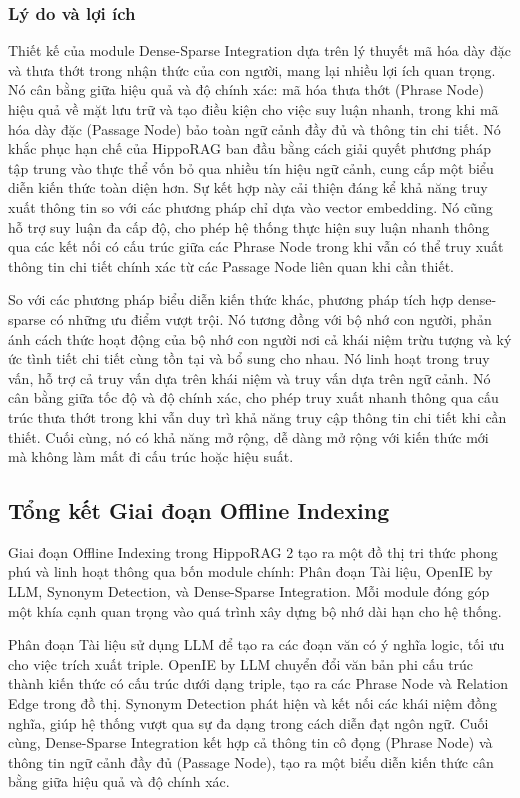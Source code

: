 \subsubsection{Lý do và lợi ích}
Thiết kế của module Dense-Sparse Integration dựa trên lý thuyết mã hóa dày đặc và thưa thớt trong nhận thức của con người, mang lại nhiều lợi ích quan trọng. Nó cân bằng giữa hiệu quả và độ chính xác: mã hóa thưa thớt (Phrase Node) hiệu quả về mặt lưu trữ và tạo điều kiện cho việc suy luận nhanh, trong khi mã hóa dày đặc (Passage Node) bảo toàn ngữ cảnh đầy đủ và thông tin chi tiết. Nó khắc phục hạn chế của HippoRAG ban đầu bằng cách giải quyết phương pháp tập trung vào thực thể vốn bỏ qua nhiều tín hiệu ngữ cảnh, cung cấp một biểu diễn kiến thức toàn diện hơn. Sự kết hợp này cải thiện đáng kể khả năng truy xuất thông tin so với các phương pháp chỉ dựa vào vector embedding. Nó cũng hỗ trợ suy luận đa cấp độ, cho phép hệ thống thực hiện suy luận nhanh thông qua các kết nối có cấu trúc giữa các Phrase Node trong khi vẫn có thể truy xuất thông tin chi tiết chính xác từ các Passage Node liên quan khi cần thiết.

So với các phương pháp biểu diễn kiến thức khác, phương pháp tích hợp dense-sparse có những ưu điểm vượt trội. Nó tương đồng với bộ nhớ con người, phản ánh cách thức hoạt động của bộ nhớ con người nơi cả khái niệm trừu tượng và ký ức tình tiết chi tiết cùng tồn tại và bổ sung cho nhau. Nó linh hoạt trong truy vấn, hỗ trợ cả truy vấn dựa trên khái niệm và truy vấn dựa trên ngữ cảnh. Nó cân bằng giữa tốc độ và độ chính xác, cho phép truy xuất nhanh thông qua cấu trúc thưa thớt trong khi vẫn duy trì khả năng truy cập thông tin chi tiết khi cần thiết. Cuối cùng, nó có khả năng mở rộng, dễ dàng mở rộng với kiến thức mới mà không làm mất đi cấu trúc hoặc hiệu suất.

\subsection{Tổng kết Giai đoạn Offline Indexing}

Giai đoạn Offline Indexing trong HippoRAG 2 tạo ra một đồ thị tri thức phong phú và linh hoạt thông qua bốn module chính: Phân đoạn Tài liệu, OpenIE by LLM, Synonym Detection, và Dense-Sparse Integration. Mỗi module đóng góp một khía cạnh quan trọng vào quá trình xây dựng bộ nhớ dài hạn cho hệ thống.

Phân đoạn Tài liệu sử dụng LLM để tạo ra các đoạn văn có ý nghĩa logic, tối ưu cho việc trích xuất triple. OpenIE by LLM chuyển đổi văn bản phi cấu trúc thành kiến thức có cấu trúc dưới dạng triple, tạo ra các Phrase Node và Relation Edge trong đồ thị. Synonym Detection phát hiện và kết nối các khái niệm đồng nghĩa, giúp hệ thống vượt qua sự đa dạng trong cách diễn đạt ngôn ngữ. Cuối cùng, Dense-Sparse Integration kết hợp cả thông tin cô đọng (Phrase Node) và thông tin ngữ cảnh đầy đủ (Passage Node), tạo ra một biểu diễn kiến thức cân bằng giữa hiệu quả và độ chính xác.

